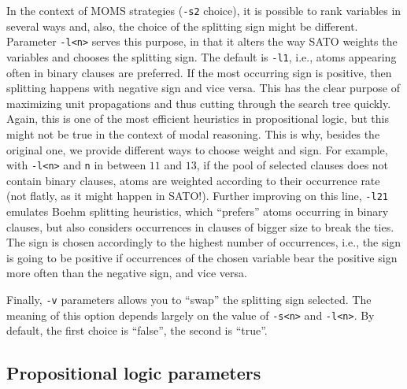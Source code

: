 \documentclass[12pt]{report}
\begin{document}
In the context of MOMS strategies ({\tt -s2} choice), it is
possible to rank variables in several ways and, also, the choice of
the splitting sign might be different. Parameter {\tt -l<n>} serves
this purpose, in that it alters the way SATO weights the variables and
chooses the splitting sign. The default is {\tt -l1}, i.e., atoms
appearing often in binary clauses are preferred. If the most occurring
sign is positive, then splitting happens with negative sign and
vice versa. This has the clear purpose of maximizing unit propagations
and thus cutting through the search tree quickly. Again, this is one of the
most efficient heuristics in propositional logic, but this might not be true
in the context of modal reasoning. This is why, besides the original
one, we provide different ways to choose weight and sign. For example,
with {\tt -l<n>} and {\tt n} in between $11$ and $13$, if the pool of
selected clauses does not contain binary clauses, atoms are weighted
according to their occurrence rate (not flatly, as it might
happen in SATO!). Further improving on this line, {\tt -l21} emulates
Boehm splitting heuristics, which ``prefers'' atoms occurring in
binary clauses, but also considers occurrences in clauses of bigger
size to break the ties. The sign is chosen accordingly to the highest
number of occurrences, i.e., the sign is going to be positive if 
occurrences of the chosen variable bear the positive sign more often
than the negative sign, and vice versa.

Finally, {\tt -v} parameters allows you to ``swap'' the splitting
sign selected. The meaning of this option depends largely on the
value of {\tt -s<n>} and {\tt -l<n>}. 
By default, the first choice is ``false'', the second is ``true''. 

\subsection{Propositional logic parameters} 
\label{sub:proponly}
\end{document}
